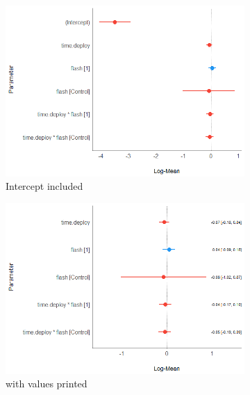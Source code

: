 



\begin{figure}
		\begin{subfigure}{.4\textwidth}
		  \centering
	\includegraphics[scale=.4]{../R/glmm_sp_files/figure-gfm/parameters-1.png}
\caption{Intercept included}
		\label{fig:para_raa1}
	\end{subfigure}
		\begin{subfigure}{.4\textwidth}
		  \centering
	\includegraphics[scale=.4]{../R/glmm_sp_files/figure-gfm/parameters-2.png}
\caption{with values printed}
		\label{fig:para_raa2}
	\end{subfigure}
		\begin{subfigure}{.8\textwidth}
		  \centering

\end{subfigure}
\end{figure}
